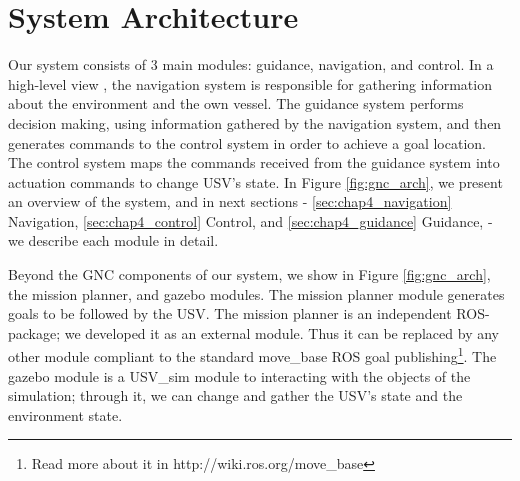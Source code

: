 \section{System Architecture}
\label{sec:sys_arch}

    Our system consists of 3 main modules: guidance, navigation, and control. In a high-level view
    , the navigation system is responsible for gathering information about the environment and the own vessel. The guidance system performs decision making, using information gathered by the navigation system, and then generates commands to the control system in order to achieve a goal location. The control system maps the commands received from the guidance system into actuation commands to change \ac{USV}'s state. In Figure \ref{fig:gnc_arch}, we present an overview of the system, and in next sections - \ref{sec:chap4_navigation} Navigation, \ref{sec:chap4_control} Control, and \ref{sec:chap4_guidance} Guidance, - we describe each module in detail.

    Beyond the \ac{GNC} components of our system, we show in Figure \ref{fig:gnc_arch}, the mission planner, and gazebo modules. The mission planner module generates goals to be followed by the \ac{USV}. The mission planner is an independent ROS-package; we developed it as an external module. Thus it can be replaced by any other module compliant to the standard move\_base ROS goal publishing\footnote{Read more about it in http://wiki.ros.org/move\_base}. The gazebo module is a USV\_sim module to interacting with the objects of the simulation; through it, we can change and gather the \ac{USV}'s state and the environment state.

